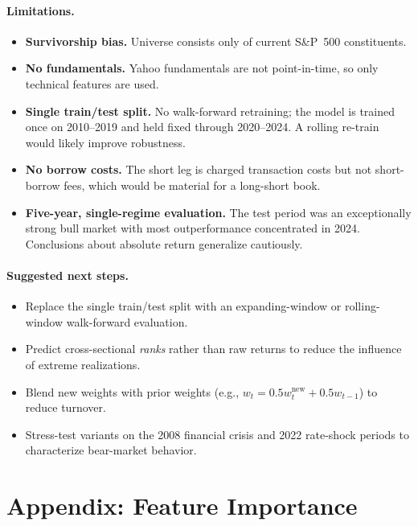 \documentclass[11pt]{article}
\begin{document}
\paragraph{Limitations.}
\begin{itemize}[leftmargin=*, itemsep=2pt]
    \item \textbf{Survivorship bias.} Universe consists only of current S\&P~500
    constituents.
    \item \textbf{No fundamentals.} Yahoo fundamentals are not point-in-time, so only
    technical features are used.
    \item \textbf{Single train/test split.} No walk-forward retraining; the model is
    trained once on 2010--2019 and held fixed through 2020--2024. A rolling re-train
    would likely improve robustness.
    \item \textbf{No borrow costs.} The short leg is charged transaction costs but not
    short-borrow fees, which would be material for a long-short book.
    \item \textbf{Five-year, single-regime evaluation.} The test period was an
    exceptionally strong bull market with most outperformance concentrated in 2024.
    Conclusions about absolute return generalize cautiously.
\end{itemize}

\paragraph{Suggested next steps.}
\begin{itemize}[leftmargin=*, itemsep=2pt]
    \item Replace the single train/test split with an expanding-window or
    rolling-window walk-forward evaluation.
    \item Predict cross-sectional \emph{ranks} rather than raw returns to reduce the
    influence of extreme realizations.
    \item Blend new weights with prior weights (e.g., $w_t = 0.5 w_t^{\text{new}} + 0.5 w_{t-1}$)
    to reduce turnover.
    \item Stress-test variants on the 2008 financial crisis and 2022 rate-shock periods
    to characterize bear-market behavior.
\end{itemize}

\appendix
\section{Appendix: Feature Importance}
\end{document}
